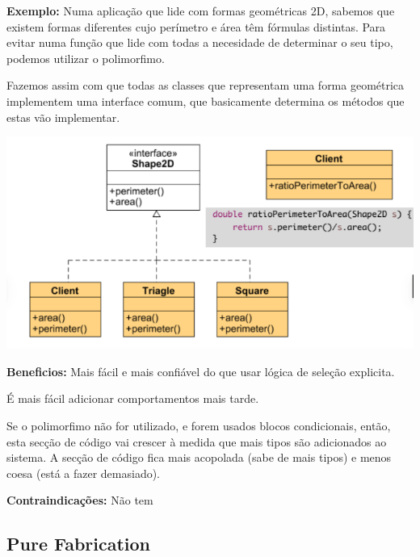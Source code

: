 \documentclass{article}
\begin{document}
\begin{flushleft}
    \textbf{Exemplo:} Numa aplicação que lide com formas geométricas 2D, sabemos que existem formas diferentes cujo
    perímetro e área têm fórmulas distintas. Para evitar numa função que lide com todas a necesidade de
    determinar o seu tipo, podemos utilizar o polimorfimo.

    Fazemos assim com que todas as classes que representam uma forma geométrica implementem uma
    interface comum, que basicamente determina os métodos que estas vão implementar.

    \begin{center}
        \includegraphics[scale=0.4]{Images/18.png}
    \end{center}
\end{flushleft}

\begin{flushleft}
    \textbf{Beneficios:} 
    Mais fácil e mais confiável do que usar lógica de seleção explicita.

    É mais fácil adicionar comportamentos mais tarde.

    Se o polimorfimo não for utilizado, e forem usados blocos condicionais,
    então, esta secção de código vai crescer à medida que mais tipos são adicionados
    ao sistema. A secção de código fica mais acopolada (sabe de mais tipos) e menos coesa
    (está a fazer demasiado).
\end{flushleft}

\begin{flushleft}
    \textbf{Contraindicações:} Não tem
\end{flushleft}

\pagebreak

\subsection{Pure Fabrication}
\end{document}

